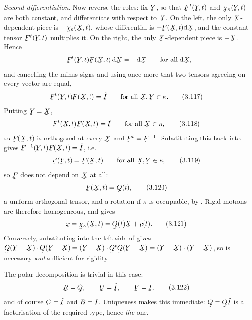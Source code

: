 \emph{Second differentiation.} Now reverse the roles: fix $\bY$, so that
$\bF^{t}(\bY,t)$ and $\bchi_{\kappa}(\bY,t)$ are both constant, and
differentiate  with respect to $\bX$. On the left, the only
$\bX$-dependent piece is $-\bchi_{\kappa}(\bX,t)$, whose differential is
$-\bF(\bX,t)\dl\bX$, and the constant tensor $\bF^{t}(\bY,t)$ multiplies
it. On the right, the only $\bX$-dependent piece is $-\bX$. Hence
\[
   -\bF^{t}(\bY,t)\bF(\bX,t)\,\dl\bX=-\dl\bX
   \qquad\text{for all }\dl\bX ,
\]
and cancelling the minus signs and using once more that two tensors
agreeing on every vector are equal,
\begin{equation}
   \bF^{t}(\bY,t)\bF(\bX,t)=\hI\qquad\text{for all }\bX,\bY\in\kappa .
   \tag{3.117}\label{eq:3.117}
\end{equation}
Putting $\bY=\bX$,
\begin{equation}
   \bF^{t}(\bX,t)\bF(\bX,t)=\hI\qquad\text{for all }\bX\in\kappa ,
   \tag{3.118}\label{eq:3.118}
\end{equation}
so $\bF(\bX,t)$ is orthogonal at every $\bX$ and $\bF^{t}=\bF^{-1}$.
Substituting this back into  gives
$\bF^{-1}(\bY,t)\bF(\bX,t)=\hI$, i.e.
\begin{equation}
   \bF(\bY,t)=\bF(\bX,t)\qquad\text{for all }\bX,\bY\in\kappa ,
   \tag{3.119}\label{eq:3.119}
\end{equation}
so $\bF$ does not depend on $\bX$ at all:
\begin{equation}
   \bF(\bX,t)=\bQ(t),
   \tag{3.120}\label{eq:3.120}
\end{equation}
a uniform orthogonal tensor, and a rotation if $\kappa$ is occupiable, by
. Rigid motions are therefore homogeneous, and  gives
\begin{equation}
   \bx=\bchi_{\kappa}(\bX,t)=\bQ(t)\bX+\bc(t).
   \tag{3.121}\label{eq:3.121}
\end{equation}
Conversely, substituting  into the left side of  gives
$\ip{\bQ(\bY-\bX)}{\bQ(\bY-\bX)}=\ip{(\bY-\bX)}{\bQ^{t}\bQ(\bY-\bX)}
=\ip{(\bY-\bX)}{(\bY-\bX)}$, so  is necessary \emph{and}
sufficient for rigidity.

The polar decomposition is trivial in this case:
\begin{equation}
   \bR=\bQ,\qquad \bU=\hI,\qquad \bV=\I,
   \tag{3.122}\label{eq:3.122}
\end{equation}
and of course $\bC=\hI$ and $\bB=\I$. Uniqueness makes this immediate:
$\bQ=\bQ\hI$ is a factorisation of the required type, hence \emph{the}
one.

